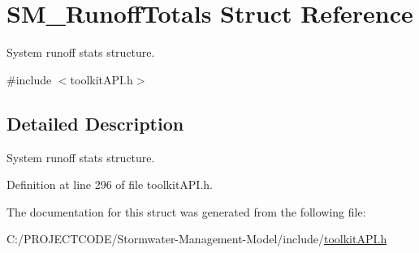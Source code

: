 \hypertarget{struct_s_m___runoff_totals}{}\section{S\+M\+\_\+\+Runoff\+Totals Struct Reference}
\label{struct_s_m___runoff_totals}


System runoff stats structure.  




{\ttfamily \#include $<$toolkit\+A\+P\+I.\+h$>$}



\subsection{Detailed Description}
System runoff stats structure. 

Definition at line 296 of file toolkit\+A\+P\+I.\+h.



The documentation for this struct was generated from the following file\+:\begin{DoxyCompactItemize}
\item 
C\+:/\+P\+R\+O\+J\+E\+C\+T\+C\+O\+D\+E/\+Stormwater-\/\+Management-\/\+Model/include/\hyperlink{toolkit_a_p_i_8h}{toolkit\+A\+P\+I.\+h}\end{DoxyCompactItemize}
